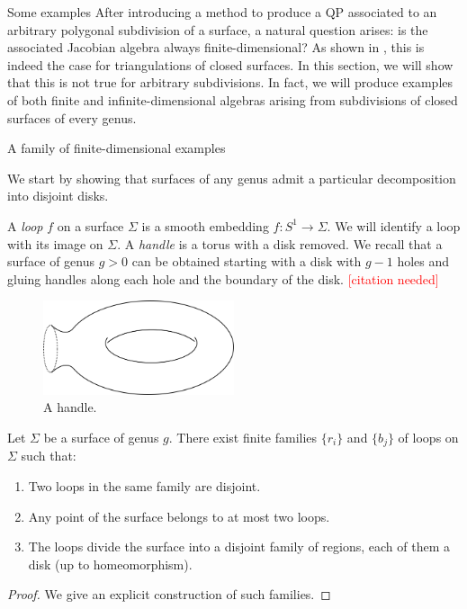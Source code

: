 \begin{chapter}{Some examples}
After introducing a method to produce a QP associated to an arbitrary polygonal subdivision of a surface, a natural question arises: is the associated Jacobian algebra always finite-dimensional? As shown in \cite{Lad12}, this is indeed the case for triangulations of closed surfaces. In this section, we will show that this is not true for arbitrary subdivisions. In fact, we will produce examples of both finite and infinite-dimensional algebras arising from subdivisions of closed surfaces of every genus.
\begin{section}{A family of finite-dimensional examples}

We start by showing that surfaces of any genus admit a particular decomposition into disjoint disks.

A \emph{loop} $f$ on a surface $\Sigma$ is a smooth embedding $f:S^1\to \Sigma$. We will identify a loop with its image on $\Sigma$. A \emph{handle} is a torus with a disk removed. We recall that a surface of genus $g>0$ can be obtained starting with a disk with $g-1$ holes and gluing handles along each hole and the boundary of the disk. \textcolor{red}{[citation needed]}

\begin{figure}[h]
\centering
	\includegraphics[width=0.5\textwidth]{handle.png}
\caption{A handle.}
\end{figure}

\begin{prop} Let $\Sigma$ be a surface of genus $g$. There exist finite families $\{r_i\}$ and $\{b_j\}$ of loops on $\Sigma$ such that:
\begin{enumerate}
\item Two loops in the same family are disjoint.
\item Any point of the surface belongs to at most two loops.
\item The loops divide the surface into a disjoint family of regions, each of them a disk (up to homeomorphism).
\end{enumerate}
\end{prop}

\begin{proof} We give an explicit construction of such families.


\end{proof}
\end{section}
\end{chapter}
